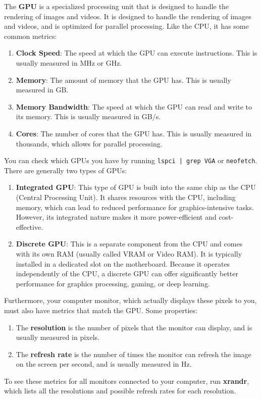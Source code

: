   \begin{definition}
    \label{def:graphics-processing-unit}
    The \textbf{GPU} is a specialized processing unit that is designed to handle the rendering of images and videos. It is designed to handle the rendering of images and videos, and is optimized for parallel processing. Like the CPU, it has some common metrics: 
    \begin{enumerate} 
      \item \textbf{Clock Speed}: The speed at which the GPU can execute instructions. This is usually measured in MHz or GHz. 
      \item \textbf{Memory}: The amount of memory that the GPU has. This is usually measured in GB. 
      \item \textbf{Memory Bandwidth}: The speed at which the GPU can read and write to its memory. This is usually measured in GB/s. 
      \item \textbf{Cores}: The number of cores that the GPU has. This is usually measured in thousands, which allows for parallel processing. 
    \end{enumerate}
    You can check which GPUs you have by running \texttt{lspci | grep VGA} or \texttt{neofetch}. There are generally two types of GPUs: 
    \begin{enumerate} 
      \item \textbf{Integrated GPU}: This type of GPU is built into the same chip as the CPU (Central Processing Unit). It shares resources with the CPU, including memory, which can lead to reduced performance for graphics-intensive tasks. However, its integrated nature makes it more power-efficient and cost-effective. 
      \item \textbf{Discrete GPU}: This is a separate component from the CPU and comes with its own RAM (usually called VRAM or Video RAM). It is typically installed in a dedicated slot on the motherboard. Because it operates independently of the CPU, a discrete GPU can offer significantly better performance for graphics processing, gaming, or deep learning. 
    \end{enumerate}
  \end{definition}

  \begin{definition}[Monitor]
    \label{def:monitor}
    Furthermore, your computer monitor, which actually displays these pixels to you, must also have metrics that match the GPU. Some properties: 
    \begin{enumerate} 
      \item The \textbf{resolution} is the number of pixels that the monitor can display, and is usually measured in pixels. 
      \item The \textbf{refresh rate} is the number of times the monitor can refresh the image on the screen per second, and is usually measured in Hz. 
    \end{enumerate}
    To see these metrics for all monitors connected to your computer, run \textbf{xrandr}, which lists all the resolutions and possible refresh rates for each resolution. 
  \end{definition}

